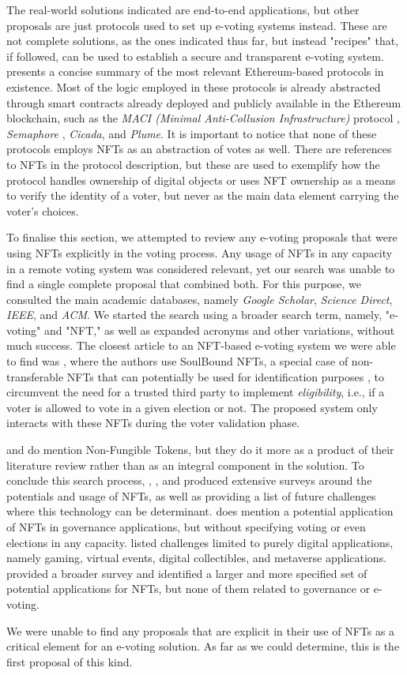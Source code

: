 \documentclass[../main.tex]{subfiles}
\begin{document}
\par
The real-world solutions indicated are end-to-end applications, but other proposals are just protocols used to set up e-voting systems instead. These are not complete solutions, as the ones indicated thus far, but instead "recipes" that, if followed, can be used to establish a secure and transparent e-voting system. \cite{Lamtzidis2023} presents a concise summary of the most relevant Ethereum-based protocols in existence. Most of the logic employed in these protocols is already abstracted through smart contracts already deployed and publicly available in the Ethereum blockchain, such as the \textit{MACI (Minimal Anti-Collusion Infrastructure)} protocol \cite{MACI2024}, \textit{Semaphore} \cite{Semaphore2024}, \textit{Cicada}, and \textit{Plume}. It is important to notice that none of these protocols employs NFTs as an abstraction of votes as well. There are references to NFTs in the protocol description, but these are used to exemplify how the protocol handles ownership of digital objects or uses NFT ownership as a means to verify the identity of a voter, but never as the main data element carrying the voter's choices.
\par
To finalise this section, we attempted to review any e-voting proposals that were using NFTs explicitly in the voting process. Any usage of NFTs in any capacity in a remote voting system was considered relevant, yet our search was unable to find a single complete proposal that combined both. For this purpose, we consulted the main academic databases, namely \textit{Google Scholar}, \textit{Science Direct}, \textit{IEEE}, and \textit{ACM}. We started the search using a broader search term, namely, "e-voting" and "NFT," as well as expanded acronyms and other variations, without much success. The closest article to an NFT-based e-voting system we were able to find was \cite{Sagar2023}, where the authors use SoulBound NFTs, a special case of non-transferable NFTs that can potentially be used for identification purposes \cite{Weyl2022}, to circumvent the need for a trusted third party to implement \textit{eligibility}, i.e., if a voter is allowed to vote in a given election or not. The proposed system only interacts with these NFTs during the voter validation phase.
\par
\cite{Bistarelli2022} and \cite{Agbesi2019} do mention Non-Fungible Tokens, but they do it more as a product of their literature review rather than as an integral component in the solution. To conclude this search process, \cite{Ali2023}, \cite{Bao2022}, and \cite{Wang2021} produced extensive surveys around the potentials and usage of NFTs, as well as providing a list of future challenges where this technology can be determinant. \cite{Ali2023} does mention a potential application of NFTs in governance applications, but without specifying voting or even elections in any capacity. \cite{Wang2021} listed challenges limited to purely digital applications, namely gaming, virtual events, digital collectibles, and metaverse applications. \cite{Bao2022} provided a broader survey and identified a larger and more specified set of potential applications for NFTs, but none of them related to governance or e-voting.
\par
We were unable to find any proposals that are explicit in their use of NFTs as a critical element for an e-voting solution. As far as we could determine, this is the first proposal of this kind.
\end{document}
